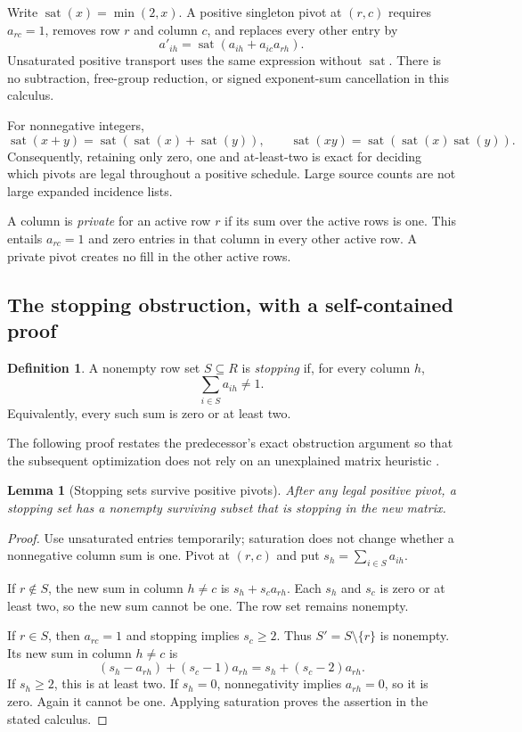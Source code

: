 \documentclass[11pt]{article}
\newtheorem{lemma}[theorem]{Lemma}
\theoremstyle{definition}\newtheorem{definition}[theorem]{Definition}
\theoremstyle{remark}\newtheorem{remark}[theorem]{Remark}
\newcommand{\sat}{\operatorname{sat}}
\begin{document}
Write $\sat(x)=\min(2,x)$. A positive singleton pivot at $(r,c)$ requires $a_{rc}=1$, removes row $r$ and column $c$, and replaces every other entry by
\begin{equation}
 a'_{ih}=\sat(a_{ih}+a_{ic}a_{rh}).
 \label{eq:pivot}
\end{equation}
Unsaturated positive transport uses the same expression without $\sat$. There is no subtraction, free-group reduction, or signed exponent-sum cancellation in this calculus.

For nonnegative integers,
\[
 \sat(x+y)=\sat(\sat(x)+\sat(y)),\qquad
 \sat(xy)=\sat(\sat(x)\sat(y)).
\]
Consequently, retaining only zero, one and at-least-two is exact for deciding which pivots are legal throughout a positive schedule. Large source counts are not large expanded incidence lists.

A column is \emph{private} for an active row $r$ if its sum over the active rows is one. This entails $a_{rc}=1$ and zero entries in that column in every other active row. A private pivot creates no fill in the other active rows.

\subsection{The stopping obstruction, with a self-contained proof}
\begin{definition}
A nonempty row set $S\subseteq R$ is \emph{stopping} if, for every column $h$,
\[
 \sum_{i\in S}a_{ih}\ne1.
\]
Equivalently, every such sum is zero or at least two.
\end{definition}

The following proof restates the predecessor's exact obstruction argument so that the subsequent optimization does not rely on an unexplained matrix heuristic \cite{positive}.

\begin{lemma}[Stopping sets survive positive pivots]
\label{lem:stop}
After any legal positive pivot, a stopping set has a nonempty surviving subset that is stopping in the new matrix.
\end{lemma}
\begin{proof}
Use unsaturated entries temporarily; saturation does not change whether a nonnegative column sum is one. Pivot at $(r,c)$ and put $s_h=\sum_{i\in S}a_{ih}$.

If $r\notin S$, the new sum in column $h\ne c$ is $s_h+s_ca_{rh}$. Each $s_h$ and $s_c$ is zero or at least two, so the new sum cannot be one. The row set remains nonempty.

If $r\in S$, then $a_{rc}=1$ and stopping implies $s_c\ge2$. Thus $S'=S\setminus\{r\}$ is nonempty. Its new sum in column $h\ne c$ is
\[
 (s_h-a_{rh})+(s_c-1)a_{rh}
   =s_h+(s_c-2)a_{rh}.
\]
If $s_h\ge2$, this is at least two. If $s_h=0$, nonnegativity implies $a_{rh}=0$, so it is zero. Again it cannot be one. Applying saturation proves the assertion in the stated calculus.
\end{proof}
\end{document}

